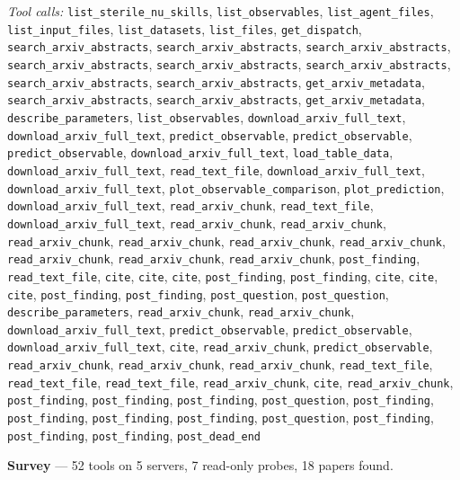 \documentclass[11pt,a4paper]{article}
\begin{document}
\textit{Tool calls:} \texttt{list\_sterile\_nu\_skills}, \texttt{list\_observables}, \texttt{list\_agent\_files}, \texttt{list\_input\_files}, \texttt{list\_datasets}, \texttt{list\_files}, \texttt{get\_dispatch}, \texttt{search\_arxiv\_abstracts}, \texttt{search\_arxiv\_abstracts}, \texttt{search\_arxiv\_abstracts}, \texttt{search\_arxiv\_abstracts}, \texttt{search\_arxiv\_abstracts}, \texttt{search\_arxiv\_abstracts}, \texttt{search\_arxiv\_abstracts}, \texttt{search\_arxiv\_abstracts}, \texttt{get\_arxiv\_metadata}, \texttt{search\_arxiv\_abstracts}, \texttt{search\_arxiv\_abstracts}, \texttt{get\_arxiv\_metadata}, \texttt{describe\_parameters}, \texttt{list\_observables}, \texttt{download\_arxiv\_full\_text}, \texttt{download\_arxiv\_full\_text}, \texttt{predict\_observable}, \texttt{predict\_observable}, \texttt{predict\_observable}, \texttt{download\_arxiv\_full\_text}, \texttt{load\_table\_data}, \texttt{download\_arxiv\_full\_text}, \texttt{read\_text\_file}, \texttt{download\_arxiv\_full\_text}, \texttt{download\_arxiv\_full\_text}, \texttt{plot\_observable\_comparison}, \texttt{plot\_prediction}, \texttt{download\_arxiv\_full\_text}, \texttt{read\_arxiv\_chunk}, \texttt{read\_text\_file}, \texttt{download\_arxiv\_full\_text}, \texttt{read\_arxiv\_chunk}, \texttt{read\_arxiv\_chunk}, \texttt{read\_arxiv\_chunk}, \texttt{read\_arxiv\_chunk}, \texttt{read\_arxiv\_chunk}, \texttt{read\_arxiv\_chunk}, \texttt{read\_arxiv\_chunk}, \texttt{read\_arxiv\_chunk}, \texttt{read\_arxiv\_chunk}, \texttt{post\_finding}, \texttt{read\_text\_file}, \texttt{cite}, \texttt{cite}, \texttt{cite}, \texttt{post\_finding}, \texttt{post\_finding}, \texttt{cite}, \texttt{cite}, \texttt{cite}, \texttt{post\_finding}, \texttt{post\_finding}, \texttt{post\_question}, \texttt{post\_question}, \texttt{describe\_parameters}, \texttt{read\_arxiv\_chunk}, \texttt{read\_arxiv\_chunk}, \texttt{download\_arxiv\_full\_text}, \texttt{predict\_observable}, \texttt{predict\_observable}, \texttt{download\_arxiv\_full\_text}, \texttt{cite}, \texttt{read\_arxiv\_chunk}, \texttt{predict\_observable}, \texttt{read\_arxiv\_chunk}, \texttt{read\_arxiv\_chunk}, \texttt{read\_arxiv\_chunk}, \texttt{read\_text\_file}, \texttt{read\_text\_file}, \texttt{read\_text\_file}, \texttt{read\_arxiv\_chunk}, \texttt{cite}, \texttt{read\_arxiv\_chunk}, \texttt{post\_finding}, \texttt{post\_finding}, \texttt{post\_finding}, \texttt{post\_question}, \texttt{post\_finding}, \texttt{post\_finding}, \texttt{post\_finding}, \texttt{post\_finding}, \texttt{post\_question}, \texttt{post\_finding}, \texttt{post\_finding}, \texttt{post\_finding}, \texttt{post\_dead\_end}\par
\textbf{Survey} --- 52 tools on 5 servers, 7 read-only probes, 18 papers found.
\end{document}
